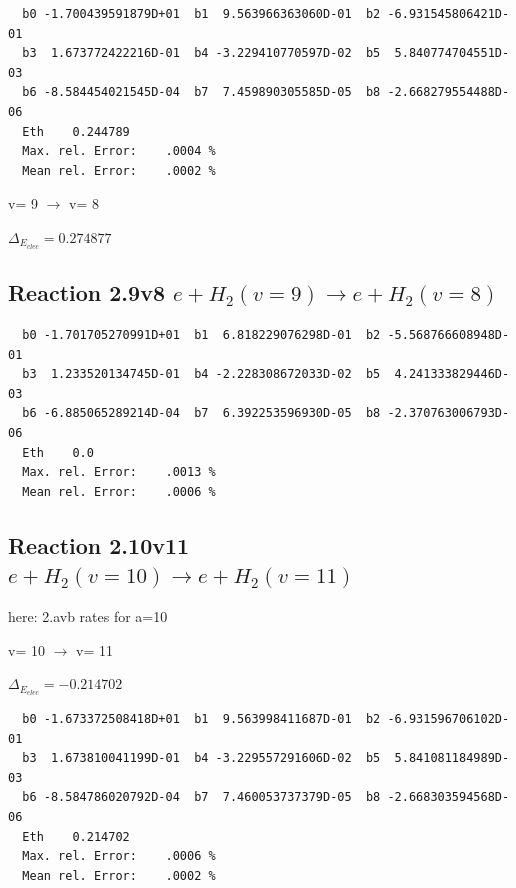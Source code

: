 \documentclass[12pt,dvipdfmx]{article}
\begin{document}
\begin{small}\begin{verbatim}
  b0 -1.700439591879D+01  b1  9.563966363060D-01  b2 -6.931545806421D-01
  b3  1.673772422216D-01  b4 -3.229410770597D-02  b5  5.840774704551D-03
  b6 -8.584454021545D-04  b7  7.459890305585D-05  b8 -2.668279554488D-06
  Eth    0.244789
  Max. rel. Error:    .0004 %
  Mean rel. Error:    .0002 %

\end{verbatim}\end{small}

  v=  9 $\rightarrow$ v= 8

$\Delta_{E_{elec}}= 0.274877$


\subsection{
Reaction 2.9v8
$ e + H_2(v=9) \rightarrow e + H_2(v=8) $
}


\begin{small}\begin{verbatim}
  b0 -1.701705270991D+01  b1  6.818229076298D-01  b2 -5.568766608948D-01
  b3  1.233520134745D-01  b4 -2.228308672033D-02  b5  4.241333829446D-03
  b6 -6.885065289214D-04  b7  6.392253596930D-05  b8 -2.370763006793D-06
  Eth    0.0
  Max. rel. Error:    .0013 %
  Mean rel. Error:    .0006 %

\end{verbatim}\end{small}
\newpage


\subsection{
Reaction 2.10v11
$ e + H_2(v=10) \rightarrow e + H_2(v=11) $
}
here: 2.avb rates for a=10


  v=  10 $\rightarrow$ v= 11

$\Delta_{E_{elec}}=-0.214702$




\begin{small}\begin{verbatim}
  b0 -1.673372508418D+01  b1  9.563998411687D-01  b2 -6.931596706102D-01
  b3  1.673810041199D-01  b4 -3.229557291606D-02  b5  5.841081184989D-03
  b6 -8.584786020792D-04  b7  7.460053737379D-05  b8 -2.668303594568D-06
  Eth    0.214702
  Max. rel. Error:    .0006 %
  Mean rel. Error:    .0002 %

\end{verbatim}\end{small}
\end{document}
